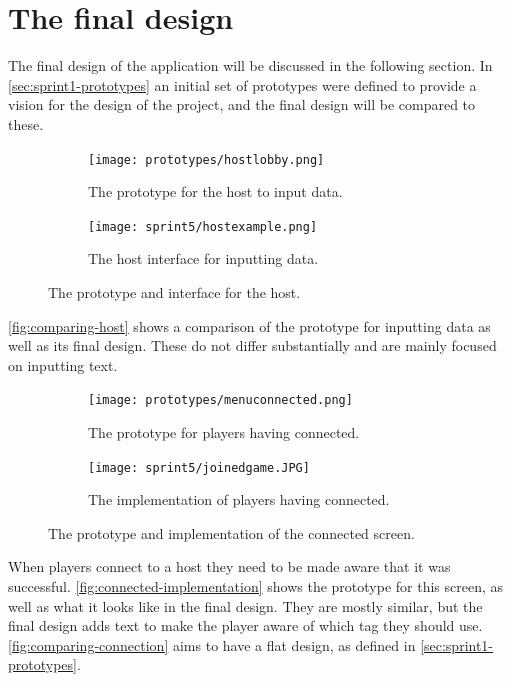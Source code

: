 \section{The final design}\label{sec:final-design}
The final design of the application will be discussed in the following section.
In \autoref{sec:sprint1-prototypes} an initial set of prototypes were defined to provide a vision for the design of the project, and the final design will be compared to these.
\begin{figure}[H]
    \centering
    \begin{subfigure}{0.45\textwidth}
        \centering
        \texttt{[image: prototypes/hostlobby.png]}
        \caption{The prototype for the host to input data.}
        \label{fig:host-prototype}
    \end{subfigure}
    \begin{subfigure}{0.45\textwidth}
        \centering
        \texttt{[image: sprint5/hostexample.png]}
        \caption{The host interface for inputting data.}
        \label{fig:host-interface}
    \end{subfigure}
    \caption{The prototype and interface for the host.}
    \label{fig:comparing-host}
\end{figure}
\noindent
\autoref{fig:comparing-host} shows a comparison of the prototype for inputting data as well as its final design.
These do not differ substantially and are mainly focused on inputting text.

\begin{figure}[H]
    \centering
    \begin{subfigure}{0.45\textwidth}
        \centering
        \texttt{[image: prototypes/menuconnected.png]}
        \caption{The prototype for players having connected.}
        \label{fig:connected-prototype}
    \end{subfigure}
    \begin{subfigure}{0.45\textwidth}
        \centering
        \texttt{[image: sprint5/joinedgame.JPG]}
        \caption{The implementation of players having connected.}
        \label{fig:connected-implementation}
    \end{subfigure}
    \caption{The prototype and implementation of the connected screen.}
    \label{fig:comparing-connection}
\end{figure}
\noindent
When players connect to a host they need to be made aware that it was successful.
\autoref{fig:connected-implementation} shows the prototype for this screen, as well as what it looks like in the final design.
They are mostly similar, but the final design adds text to make the player aware of which tag they should use.
\autoref{fig:comparing-connection} aims to have a flat design, as defined in \autoref{sec:sprint1-prototypes}.

